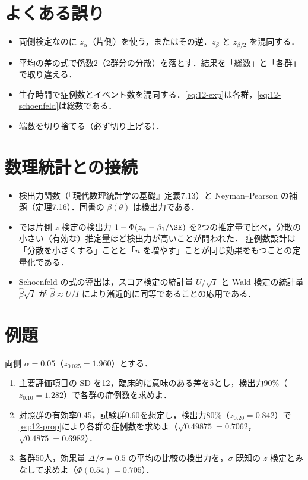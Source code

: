 \section{よくある誤り}\label{sec:12-err}
\begin{warnbox}
\begin{itemize}
\item 両側検定なのに $z_\alpha$（片側）を使う，またはその逆．$z_\beta$ と $z_{\beta/2}$ を混同する．
\item 平均の差の式で係数2（2群分の分散）を落とす．結果を「総数」と「各群」で取り違える．
\item 生存時間で症例数とイベント数を混同する．\cref{eq:12-exp}は各群，\cref{eq:12-schoenfeld}は総数である．
\item 端数を切り捨てる（必ず切り上げる）．
\end{itemize}
\end{warnbox}

\section{数理統計との接続}\label{sec:12-link}
\begin{linkbox}
\begin{itemize}
\item 検出力関数（『現代数理統計学の基礎』定義7.13）と Neyman--Pearson の補題（定理7.16）．同書の $\beta(\theta)$ は検出力である．
\item {} では片側 $z$ 検定の検出力 $1-\Phi(z_\alpha-\beta_1/\SE)$ を2つの推定量で比べ，分散の小さい（有効な）推定量ほど検出力が高いことが問われた．
      症例数設計は「分散を小さくする」ことと「$n$ を増やす」ことが同じ効果をもつことの定量化である．
\item Schoenfeld の式の導出は，スコア検定の統計量 $U/\sqrt I$ と Wald 検定の統計量 $\hat\beta\sqrt I$ が $\hat\beta\approx U/I$ により漸近的に同等であることの応用である．
\end{itemize}
\end{linkbox}

\section{例題}\label{sec:12-ex}
\begin{reidai}\label{reidai:12-1}
両側 $\alpha=0.05$（$z_{0.025}=1.960$）とする．
\begin{enumerate}[label=(\arabic*)]
\item 主要評価項目の SD を12，臨床的に意味のある差を5とし，検出力90\%（$z_{0.10}=1.282$）で各群の症例数を求めよ．
\item 対照群の有効率0.45，試験群0.60を想定し，検出力80\%（$z_{0.20}=0.842$）で\cref{eq:12-prop}により各群の症例数を求めよ（$\sqrt{0.49875}=0.7062$，$\sqrt{0.4875}=0.6982$）．
\item 各群50人，効果量 $\Delta/\sigma=0.5$ の平均の比較の検出力を，$\sigma$ 既知の $z$ 検定とみなして求めよ（$\Phi(0.54)=0.705$）．
\end{enumerate}
\end{reidai}

